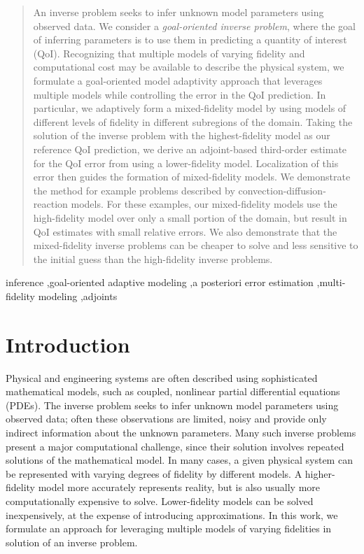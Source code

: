 \documentclass[review,sort&compress]{elsarticle}
\theoremstyle{plain} %
\theoremstyle{definition} %
\begin{document}
\begin{frontmatter}
\begin{abstract}
An inverse problem seeks to infer unknown model parameters using observed data. We consider a \textit{goal-oriented inverse problem}, where the goal of inferring parameters is to use them in predicting a quantity of interest (QoI). Recognizing that multiple models of varying fidelity and computational cost may be available to describe the physical system, we formulate a goal-oriented model adaptivity approach that leverages multiple models while controlling the error in the QoI prediction. In particular, we adaptively form a mixed-fidelity model by using models of different levels of fidelity in different subregions of the domain. Taking the solution of the inverse problem with the highest-fidelity model as our reference QoI prediction, we derive an adjoint-based third-order estimate for the QoI error from using a lower-fidelity model. Localization of this error then guides the formation of mixed-fidelity models. We demonstrate the method for example problems described by convection-diffusion-reaction models. For these examples, our mixed-fidelity models use the high-fidelity model over only a small portion of the domain, but result in QoI estimates with small relative errors. We also demonstrate that the mixed-fidelity inverse problems can be cheaper to solve and less sensitive to the initial guess than the high-fidelity inverse problems.


\end{abstract}

\begin{keyword}
  inference \sep goal-oriented adaptive modeling \sep a posteriori error estimation \sep multi-fidelity modeling \sep adjoints
\end{keyword}

\end{frontmatter}


\section{Introduction}

Physical and engineering systems are often described using sophisticated mathematical models, such as coupled, nonlinear partial differential equations (PDEs). The inverse problem seeks to infer unknown model parameters using observed data; often these observations are limited, noisy and provide only indirect information about the unknown parameters. Many such inverse problems present a major computational challenge, since their solution involves repeated solutions of the mathematical model. In many cases, a given physical system can be represented with varying degrees of fidelity by different models. A higher-fidelity model more accurately represents reality, but is also usually more computationally expensive to solve. Lower-fidelity models can be solved inexpensively, at the expense of introducing approximations. In this work, we formulate an approach for leveraging multiple models of varying fidelities in solution of an inverse problem.
\end{document}
